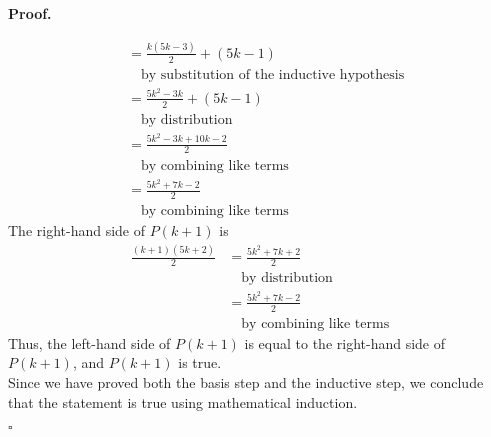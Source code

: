 \documentclass{article}
\newenvironment{proof}{
    \begin{mdframed}[nobreak=false, innerleftmargin=10pt, innerrightmargin=10pt, innertopmargin=10pt, innerbottommargin=10pt]
    \textbf{Proof.}
}{
    \hfill $\square$
    \end{mdframed}
}
\begin{document}
\begin{proof}
\begin{align*}
            &= \frac{k(5k-3)}{2} + (5k-1) \\
            & \quad \text{by substitution of the inductive hypothesis} \\
            &= \frac{5k^2-3k}{2} + (5k-1) \\
            & \quad \text{by distribution} \\
            &= \frac{5k^2-3k+10k-2}{2} \\
            & \quad \text{by combining like terms} \\
            &= \frac{5k^2+7k-2}{2} \\
            & \quad \text{by combining like terms}
        \end{align*}
        The right-hand side of $P(k+1)$ is
        \begin{align*}
            \frac{(k+1)(5k+2)}{2} &= \frac{5k^2+7k+2}{2} \\
            & \quad \text{by distribution} \\
            &= \frac{5k^2+7k-2}{2} \\
            & \quad \text{by combining like terms}
        \end{align*}
        Thus, the left-hand side of $P(k+1)$ is equal to the right-hand side of $P(k+1)$, and $P(k+1)$ is true. \\
        Since we have proved both the basis step and the inductive step, we conclude that the statement is true using mathematical induction.
    \end{proof}
\end{document}
